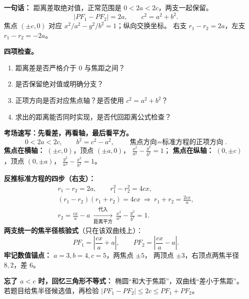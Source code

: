 \begin{summarybox}
\textbf{一句话：} 距离差取绝对值，正常范围是 $0<2a<2c$，两支一起保留。
\[
|PF_1-PF_2|=2a,\qquad c^2=a^2+b^2.
\]
焦点 $(\pm c,0)$ 对应 $x^2/a^2-y^2/b^2=1$；纵向交换坐标。
右支 $r_1-r_2=2a$，左支 $r_1-r_2=-2a$。

\textbf{四项检查。}
\begin{enumerate}[leftmargin=*]
\item 距离差是否严格介于 $0$ 与焦距之间？
\item 是否保留绝对值或明确分支？
\item 正项方向是否对应焦点轴？是否使用 $c^2=a^2+b^2$？
\item 求出的距离能否同时实现，是否代回距离公式检查？
\end{enumerate}
\end{summarybox}

\begin{summarybox}
\textbf{考场速写：先看差，再看轴，最后看平方。}
\[
\boxed{0<2a<2c},\qquad
\boxed{b^2=c^2-a^2},\qquad
\boxed{\text{焦点方向}=\text{标准方程的正项方向}}.
\]
\textbf{焦点在横轴：} $(\pm c,0)$，顶点 $(\pm a,0)$，
$\displaystyle\frac{x^2}{a^2}-\frac{y^2}{b^2}=1$；
\textbf{焦点在纵轴：} $(0,\pm c)$，顶点 $(0,\pm a)$，
$\displaystyle\frac{y^2}{a^2}-\frac{x^2}{b^2}=1$。

\par\medskip\noindent
\textbf{反推标准方程的四步（右支）：}
\[
\begin{gathered}
r_1-r_2=2a,\qquad r_1^2-r_2^2=4cx,\\
(r_1-r_2)(r_1+r_2)=4cx
\ \Longrightarrow\ r_1+r_2=\frac{2cx}{a},\\
r_2=\frac{cx}{a}-a
\ \xrightarrow[\text{距离平方}]{\text{代入}}
\ \frac{x^2}{a^2}-\frac{y^2}{b^2}=1.
\end{gathered}
\]
\textbf{两支统一的焦半径核验式}（只在该双曲线上）：
\[
PF_1=\left|\frac{cx}{a}+a\right|,\qquad
PF_2=\left|\frac{cx}{a}-a\right|.
\]
\textbf{牢记数值锚点：} $a=3,b=4,c=5$，两焦点 $\pm5$，
两顶点 $\pm3$，右顶点两焦半径 $8,2$，差 $6$。

\textbf{忘了 $a<c$ 时，回忆三角形不等式：}
椭圆“和大于焦距”，双曲线“差小于焦距”。
若题目给焦半径候选值，再检验
$|PF_1-PF_2|\le2c\le PF_1+PF_2$。
\end{summarybox}
